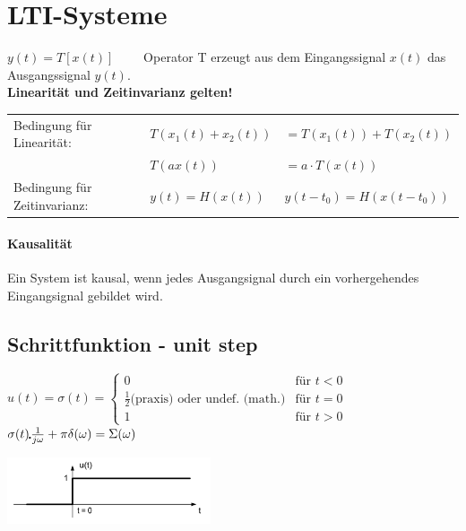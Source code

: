 \section{LTI-Systeme }
\begin{center}
	
\end{center}

$ y(t) = T [ x(t)] \qquad $ Operator T erzeugt aus dem Eingangssignal $ x(t) $ das Ausgangssignal $ y(t)$. \\
\textbf{Linearität und Zeitinvarianz gelten!}\\
\begin{tabular}{lll}
	Bedingung für Linearität: & $T(x_1(t)+x_2(t))$ & $= T(x_1(t)) + T(x_2(t))$ \\
	& $T(ax(t))$ & $= a\cdot T(x(t))$\\
	Bedingung für Zeitinvarianz: & $y(t) = H(x(t))$ & $y(t-t_0) = H(x(t-t_0))$ \\
\end{tabular}

	\paragraph{Kausalität} Ein System ist kausal, wenn jedes Ausgangsignal durch ein vorhergehendes Eingangsignal gebildet wird.
\\

\subsection{Schrittfunktion - unit step}
	\begin{minipage}{10cm}
		$u(t) = \sigma(t) =	\begin{cases}
		  		 0 & \text{für } t < 0 \\
		  		 \frac{1}{2} \text{(praxis)}  \text{ oder undef. (math.)} & \text{für } t = 0 \\
		  		 1 & \text{für } t > 0
		  	\end{cases}
		$
		$\sigma(t) \FT \frac{1}{j\omega} + \pi\delta(\omega) = \Sigma(\omega)$
	\end{minipage}
	\begin{minipage}{8cm}
		\includegraphics[width=6cm]{./bilder/unitstep.png}
	\end{minipage}

